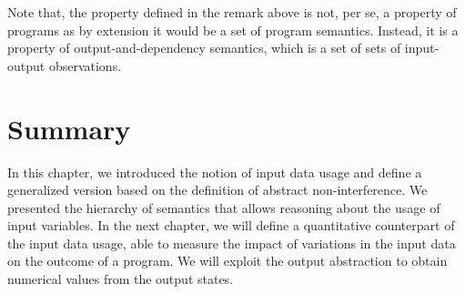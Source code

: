 Note that, the property defined in the remark above is not, per se, a property of programs as by extension it would be a set of program semantics.
Instead, it is a property of output-and-dependency semantics, which is a set of sets of input-output observations.

\section{Summary}

In this chapter, we introduced the notion of input data usage and define a generalized version based on the definition of abstract non-interference.
We presented the hierarchy of semantics that allows reasoning about the usage of input variables.
In the next chapter, we will define a quantitative counterpart of the input data usage, able to measure the impact of variations in the input data on the outcome of a program. We will exploit the output abstraction to obtain numerical values from the output states.
